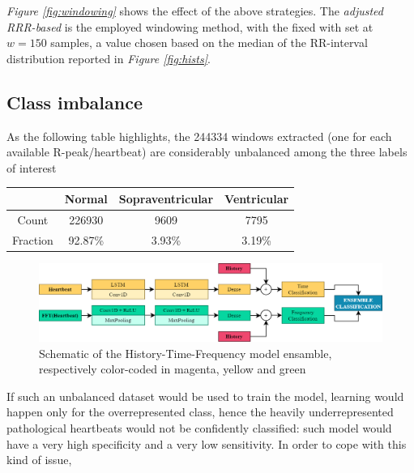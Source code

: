 \documentclass[conference]{IEEEtran}
\newcommand{\fig}[1]{\textit{Figure \ref{#1}}}
\begin{document}
    \fig{fig:windowing} shows the effect of the above strategies. The
    \textit{adjusted RRR-based} is the employed windowing method, with the
    fixed with set at $w = 150$ samples, a value chosen based on the
    median of the RR-interval distribution reported in \fig{fig:hists}.

\subsection{Class imbalance}
    As the following table highlights, the 244334 windows extracted 
    (one for each available R-peak/heartbeat) are
    considerably unbalanced among the three labels of interest
    \begin{center}
        \begin{tabular}{||c |c c c||}
            \hline
            & Normal & Sopraventricular & Ventricular \\
            \hline \hline
            Count & 226930 & 9609 & 7795 \\
            \hline
            Fraction & 92.87\% & 3.93\% & 3.19\% \\
            \hline
        \end{tabular}
    \end{center}

    
    \begin{figure}
        \centering
        \includegraphics{img/model.png}
        \caption{Schematic of the History-Time-Frequency model ensamble,
        respectively color-coded in magenta, yellow and green}
        \label{fig:model}
    \end{figure}

    If such an unbalanced dataset would be used to train the model, learning
    would happen only for the overrepresented class, hence the heavily
    underrepresented pathological heartbeats would not be confidently
    classified: such model would have a very high specificity and a very low
    sensitivity. In order to cope with this kind of issue,

\end{document}
